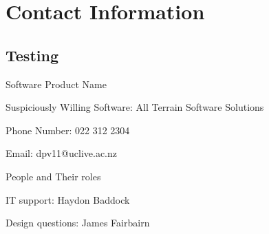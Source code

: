 \section{Contact Information}
\subsection{Testing}

Software Product Name

Suspiciously Willing Software: All Terrain Software Solutions

Phone Number: 022 312 2304

Email: dpv11@uclive.ac.nz

People and Their roles

IT support: Haydon Baddock

Design questions: James Fairbairn

